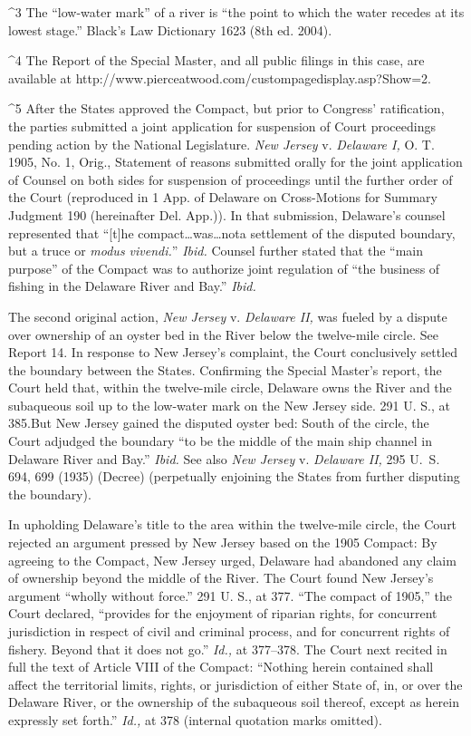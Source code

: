 {^3 The ``low-water mark'' of a river is ``the point to which the
water recedes at its lowest stage.'' Black's Law Dictionary 1623
(8th ed. 2004).

^4 The Report of the Special Master, and all
public filings in this case, are available at
http://www.pierceatwood.com/custompagedisplay.asp?Show=2.

^5 After the States approved the Compact, but prior to Congress'
ratification, the parties submitted a joint application for suspension
of Court proceedings pending action by the National Legislature. \emph{New
Jersey} v. \emph{Delaware I,} O. T. 1905, No. 1, Orig., Statement of
reasons submitted orally for the joint application of Counsel on both
sides for suspension of proceedings until the further order of the Court
(reproduced in 1 App. of Delaware on Cross-Motions for Summary Judgment
190 (hereinafter Del. App.)). In that submission, Delaware's counsel
represented that ``[t]he compact\dots was\dots nota settlement of
the disputed boundary, but a truce or \emph{modus vivendi.}'' \emph{Ibid.}
Counsel further stated that the ``main purpose'' of the Compact was to
authorize joint regulation of ``the business of fishing in the Delaware
River and Bay.'' \emph{Ibid.}

  The second original action, \emph{New Jersey} v. \emph{Delaware II,} was
fueled by a dispute over ownership of an oyster bed in the River below
the twelve-mile circle. See Report 14. In response to New Jersey's
complaint, the Court conclusively settled the boundary between the
States. Confirming the Special Master's report, the Court held
that, within the twelve-mile circle, Delaware owns the River and the
subaqueous soil up to the low-water mark on the New Jersey side. 291
U. S., at 385.\footnotemark[6] But New Jersey gained the disputed oyster bed:
South of the circle, the Court adjudged the boundary ``to be the middle
of the main ship channel in Delaware River and Bay.'' \emph{Ibid.} See
also \emph{New Jersey} v. \emph{Delaware II,} 295 U.~S. 694, 699 (1935)
(Decree) (perpetually enjoining the States from further disputing the
boundary).

  In upholding Delaware's title to the area within the twelve-mile
circle, the Court rejected an argument pressed by New Jersey based on
the 1905 Compact: By agreeing to the Compact, New Jersey urged, Delaware
had abandoned any claim of ownership beyond the middle of the River. The
Court found New Jersey's argument ``wholly without force.'' 291 U.
S., at 377. ``The compact of 1905,'' the Court declared, ``provides
for the enjoyment of riparian rights, for concurrent jurisdiction in
respect of civil and criminal process, and for concurrent rights of
fishery. Beyond that it does not go.'' \emph{Id.,} at 377--378. The
Court next recited in full the text of Article VIII of the Compact:
``Nothing herein contained shall affect the territorial limits, rights,
or jurisdiction of either State of, in, or over the Delaware River, or
the ownership of the subaqueous soil thereof, except as herein \newpage 
expressly set forth.'' \emph{Id.,} at 378 (internal quotation marks
omitted).

}
